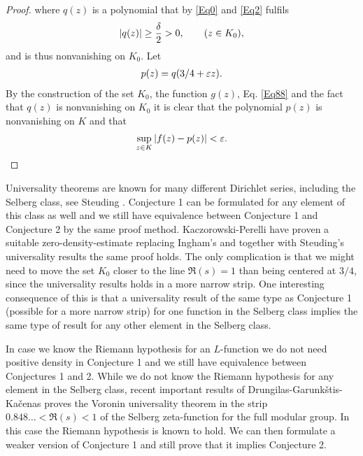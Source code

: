 \documentclass[11pt]{article}
\begin{document}
\begin{proof}
where $q(z)$ is a polynomial that by \eqref{Eq0} and \eqref{Eq2} fulfils
 \begin{gather*} 
  {\left| {q(z)} \right|}\geq \frac \delta 2 >0, \qquad (z \in K_0),
\end{gather*}
and is thus nonvanishing on $K_0$. Let
\begin{gather*}
  p(z)=q{\left( {3/4+\varepsilon z} \right)}.
\end{gather*}
By the construction of the set $K_0$, the function $g(z)$,  Eq. \eqref{Eq88} and the fact that $q(z)$ is nonvanishing on $K_0$   it is clear that the polynomial $p(z)$ is nonvanishing on $K$ and that
\begin{gather*}
  \sup_{z \in K} {\left| {f(z)-p(z)} \right|}<\varepsilon.
\end{gather*} 
 \end{proof}
\begin{rem}
  Universality theorems are known for many different Dirichlet series, including the Selberg class, see Steuding \cite{Steuding}. Conjecture 1 can be formulated for any element of this class as well and we still have equivalence between Conjecture 1 and Conjecture 2 by the same proof method. Kaczorowski-Perelli \cite{KacPer} have proven a suitable zero-density-estimate replacing Ingham's and together with Steuding's universality results the same proof holds. The only complication is that we might need to move the set $K_0$ closer to the line $\Re(s)=1$ than being centered at $3/4$, since the universality results holds in a more narrow strip. One interesting consequence of this is that a universality result of the same type as Conjecture 1 (possible for a more narrow strip) for one function in the Selberg class implies the same type of result for any other element in the Selberg class.
\end{rem}

\begin{rem}
  In case we know the Riemann hypothesis for an $L$-function we do not need positive density in Conjecture 1 and we still have equivalence between Conjectures 1 and 2. While we do not know the Riemann hypothesis for any element in the Selberg class, recent important  results of Drungilas-Garunk{\v{s}}tis-Ka{\v{c}}enas \cite{DruGarKac} proves the Voronin universality theorem in the strip $0.848\ldots <\Re(s)<1$ of the  Selberg zeta-function for the full modular group. In this case the Riemann hypothesis is known to hold. We can then formulate a weaker version of Conjecture 1 and still prove that it implies Conjecture 2.
\end{rem}
\end{document}
